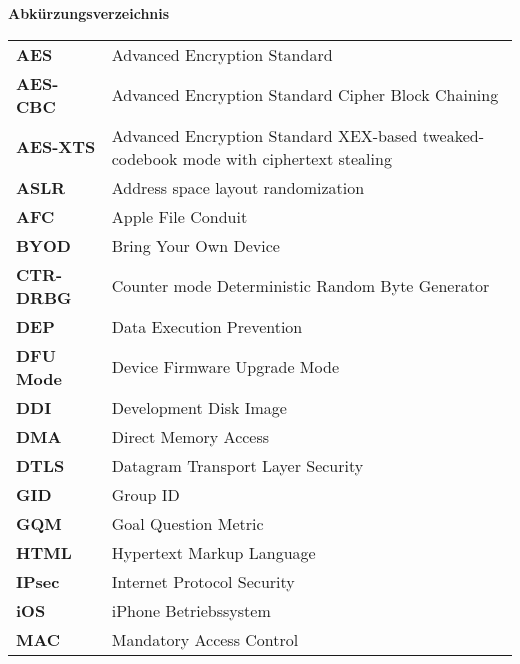 %
%
% 
% 
% 

\begin{center}
{\Large\bfseries Abkürzungsverzeichnis}
\end{center}

\begin{table*}[htbp]
		 \begin{tabular}{p{3cm}p{12cm}} 
		    \textbf{AES} & Advanced Encryption Standard \\
            \textbf{AES-CBC} & Advanced Encryption Standard Cipher Block Chaining \\
            \textbf{AES-XTS} & Advanced Encryption Standard XEX-based tweaked-codebook mode with ciphertext stealing \\ 
		     \textbf{ASLR} & Address space layout randomization \\
		     \textbf{AFC} & Apple File Conduit\\
		     
		     \textbf{BYOD} & Bring Your Own Device\\
		     
		     \textbf{CTR-DRBG} & Counter mode Deterministic Random Byte Generator \\
		     
		     \textbf{DEP} & Data Execution Prevention \\
		     \textbf{DFU Mode} & Device Firmware Upgrade Mode\\
		     \textbf{DDI} & Development Disk Image \\
		     \textbf{DMA} & Direct Memory Access\\
		     \textbf{DTLS} & Datagram Transport Layer Security \\
		     
		     \textbf{GID} & Group ID \\
		     \textbf{GQM} & Goal Question Metric\\
		     
		     \textbf{HTML} & Hypertext Markup Language \\
		     
		     \textbf{IPsec} & Internet Protocol Security \\
		     \textbf{iOS} & iPhone Betriebssystem\\
		     \textbf{MAC} & Mandatory Access Control \\


\end{tabular}
\end{table*}
